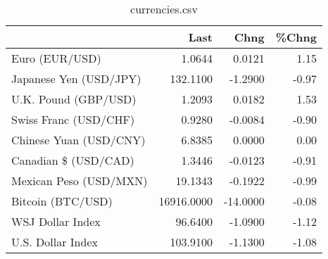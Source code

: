 \documentclass{article}%
\begin{document}
%


\begin{table}[htbp]%
\caption{currencies.csv}%
\centering%
\begin{adjustbox}{width=1\textwidth}%
\begin{tabular}{lrrr}
\toprule
                       &       Last &     Chng &  \%Chng \\
\midrule
        Euro (EUR/USD) &     1.0644 &   0.0121 &   1.15 \\
Japanese Yen (USD/JPY) &   132.1100 &  -1.2900 &  -0.97 \\
  U.K. Pound (GBP/USD) &     1.2093 &   0.0182 &   1.53 \\
 Swiss Franc (USD/CHF) &     0.9280 &  -0.0084 &  -0.90 \\
Chinese Yuan (USD/CNY) &     6.8385 &   0.0000 &   0.00 \\
  Canadian \$ (USD/CAD) &     1.3446 &  -0.0123 &  -0.91 \\
Mexican Peso (USD/MXN) &    19.1343 &  -0.1922 &  -0.99 \\
     Bitcoin (BTC/USD) & 16916.0000 & -14.0000 &  -0.08 \\
      WSJ Dollar Index &    96.6400 &  -1.0900 &  -1.12 \\
     U.S. Dollar Index &   103.9100 &  -1.1300 &  -1.08 \\
\bottomrule
\end{tabular}
%
\end{adjustbox}%
\end{table}

%
\end{document}
